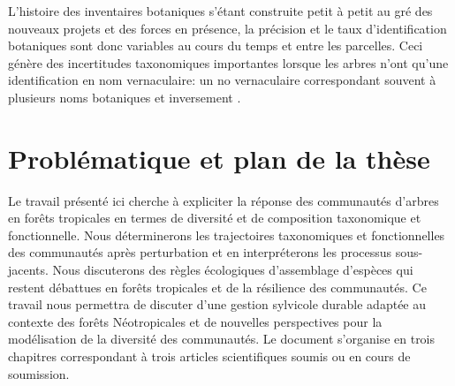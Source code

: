 \documentclass[
  11pt,
  french,
  A4paper,
  extrafontsizes,onecolumn,openright
  ]{memoir}
\begin{document}
L'histoire des inventaires botaniques s'étant construite petit à petit
au gré des nouveaux projets et des forces en présence, la précision et
le taux d'identification botaniques sont donc variables au cours du
temps et entre les parcelles. Ceci génère des incertitudes taxonomiques
importantes lorsque les arbres n'ont qu'une identification en nom
vernaculaire: un no vernaculaire correspondant souvent à plusieurs noms
botaniques et inversement \autocite{Oldeman1968}.

\section{Problématique et plan de la
thèse}\label{problematique-et-plan-de-la-these}

Le travail présenté ici cherche à expliciter la réponse des communautés
d'arbres en forêts tropicales en termes de diversité et de composition
taxonomique et fonctionnelle. Nous déterminerons les trajectoires
taxonomiques et fonctionnelles des communautés après perturbation et en
interpréterons les processus sous-jacents. Nous discuterons des règles
écologiques d'assemblage d'espèces qui restent débattues en forêts
tropicales et de la résilience des communautés. Ce travail nous
permettra de discuter d'une gestion sylvicole durable adaptée au
contexte des forêts Néotropicales et de nouvelles perspectives pour la
modélisation de la diversité des communautés. Le document s'organise en
trois chapitres correspondant à trois articles scientifiques soumis ou
en cours de soumission.
\end{document}
